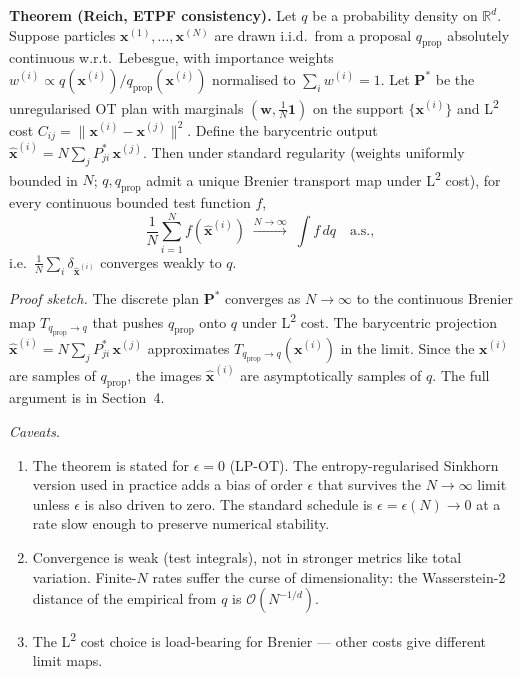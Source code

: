 \documentclass{article}
\begin{document}
\textbf{Theorem (Reich, ETPF consistency).} Let $q$ be a probability density on $\mathbb{R}^d$. Suppose particles $\mathbf{x}^{(1)}, \ldots, \mathbf{x}^{(N)}$ are drawn i.i.d.\ from a proposal $q_{\text{prop}}$ absolutely continuous w.r.t.\ Lebesgue, with importance weights $w^{(i)} \propto q(\mathbf{x}^{(i)}) / q_{\text{prop}}(\mathbf{x}^{(i)})$ normalised to $\sum_i w^{(i)} = 1$. Let $\mathbf{P}^{*}$ be the unregularised OT plan with marginals $(\mathbf{w}, \tfrac{1}{N}\mathbf{1})$ on the support $\{\mathbf{x}^{(i)}\}$ and L\textsuperscript{2} cost $C_{ij} = \|\mathbf{x}^{(i)} - \mathbf{x}^{(j)}\|^2$. Define the barycentric output $\hat{\mathbf{x}}^{(i)} = N \sum_j P^{*}_{ji}\, \mathbf{x}^{(j)}$. Then under standard regularity (weights uniformly bounded in $N$; $q, q_{\text{prop}}$ admit a unique Brenier transport map under L\textsuperscript{2} cost), for every continuous bounded test function $f$,
\begin{equation}
\frac{1}{N}\sum_{i=1}^N f(\hat{\mathbf{x}}^{(i)}) \;\xrightarrow{N \to \infty}\; \int f \, dq \quad \text{a.s.},
\end{equation}
i.e.\ $\tfrac{1}{N}\sum_i \delta_{\hat{\mathbf{x}}^{(i)}}$ converges weakly to $q$.

\textit{Proof sketch.} The discrete plan $\mathbf{P}^{*}$ converges as $N \to \infty$ to the continuous Brenier map $T_{q_{\text{prop}}\to q}$ that pushes $q_{\text{prop}}$ onto $q$ under L\textsuperscript{2} cost. The barycentric projection $\hat{\mathbf{x}}^{(i)} = N \sum_j P^{*}_{ji}\, \mathbf{x}^{(j)}$ approximates $T_{q_{\text{prop}}\to q}(\mathbf{x}^{(i)})$ in the limit. Since the $\mathbf{x}^{(i)}$ are samples of $q_{\text{prop}}$, the images $\hat{\mathbf{x}}^{(i)}$ are asymptotically samples of $q$. The full argument is in \cite{reich2013nonparametric} Section~4.

\textit{Caveats.}
\begin{enumerate}
\item The theorem is stated for $\epsilon = 0$ (LP-OT). The entropy-regularised Sinkhorn version used in practice adds a bias of order $\epsilon$ that survives the $N \to \infty$ limit unless $\epsilon$ is also driven to zero. The standard schedule is $\epsilon = \epsilon(N) \to 0$ at a rate slow enough to preserve numerical stability.
\item Convergence is weak (test integrals), not in stronger metrics like total variation. Finite-$N$ rates suffer the curse of dimensionality: the Wasserstein-2 distance of the empirical from $q$ is $\mathcal{O}(N^{-1/d})$.
\item The L\textsuperscript{2} cost choice is load-bearing for Brenier --- other costs give different limit maps.
\end{enumerate}
\end{document}
